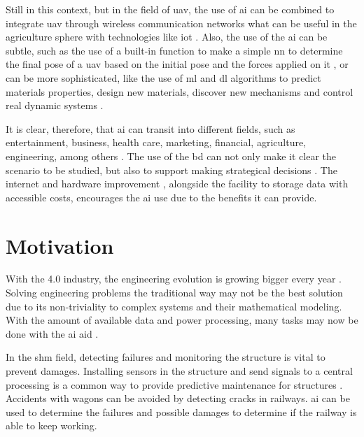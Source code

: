 Still in this context, but in the field of \gls*{uav}, the use of \gls*{ai} can be combined to integrate \gls*{uav} through wireless communication networks \citep{lahmeri2021} what can be useful in the agriculture sphere \citep{ahirwar2019} with technologies like \gls*{iot} \citep{verdouw2016,tzounis2017}.
Also, the use of the \gls*{ai} can be subtle, such as the use of a built-in \matlab function to make a simple \gls*{nn} to determine the final pose of a \gls*{uav} based on the initial pose and the forces applied on it \citep{geronel2023}, or can be more sophisticated, like the use of \gls*{ml} and \gls*{dl} algorithms to predict materials properties, design new materials, discover new mechanisms and control real dynamic systems \citep{guo2021,assilian1974}.

It is clear, therefore, that \gls*{ai} can transit into different fields, such as entertainment, business, health care, marketing, financial, agriculture, engineering, among others \citep{ruiz-real2020,yu2018,davenport2019,verma2021,mhlanga2020,pannu2015,ghatrehsamani2023}. 
The use of the \gls*{bd} can not only make it clear the scenario to be studied, but also to support making strategical decisions \citep{jeble2018,koscielniak2015}.
The internet and hardware improvement \citep{baji2018}, alongside the facility to storage data with accessible costs, encourages the \gls*{ai} use due to the benefits it can provide.

\section{Motivation}

With the 4.0 industry, the engineering evolution is growing bigger every year \citep{meindl2021}.
Solving engineering problems the traditional way may not be the best solution due to its non-triviality to complex systems and their mathematical modeling.
With the amount of available data and power processing, many tasks may now be done with the \gls*{ai} aid \citep{pham1998}.

In the \gls*{shm} field, detecting failures and monitoring the structure is vital to prevent damages. 
Installing sensors in the structure and send signals to a central processing is a common way to provide predictive maintenance for structures \citep{kahandawa2012,nagayama2007}.
Accidents with wagons can be avoided by detecting cracks in railways.
\gls*{ai} can be used to determine the failures and possible damages to determine if the railway is able to keep working.

